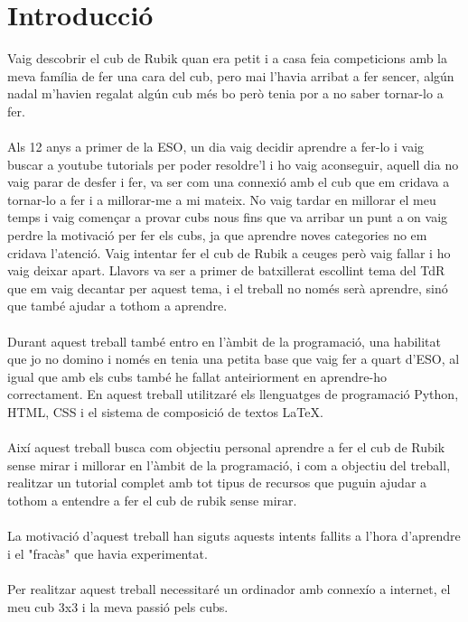 \part*{Introducció}
\pagestyle{Introducció}

Vaig descobrir el cub de Rubik quan era petit i a casa feia competicions amb la meva família de fer una cara del cub, pero mai l'havia arribat a fer sencer, algún nadal m'havien regalat algún cub més bo però tenia por a no saber tornar-lo a fer.
\\\\Als 12 anys a primer de la ESO, un dia vaig decidir aprendre a fer-lo i vaig buscar a youtube tutorials per poder resoldre'l i ho vaig aconseguir, aquell dia no vaig parar de desfer i fer, va ser com una connexió amb el cub que em cridava a tornar-lo a fer i a millorar-me a mi mateix.
No vaig tardar en millorar el meu temps i vaig començar a provar cubs nous fins que va arribar un punt a on vaig perdre la motivació per fer els cubs, ja que aprendre noves categories no em cridava l'atenció. Vaig intentar fer el cub de Rubik a ceuges però vaig fallar i ho vaig deixar apart.
Llavors va ser a primer de batxillerat escollint tema del TdR que em vaig decantar per aquest tema, i el treball no només serà aprendre, sinó que també ajudar a tothom a aprendre. 
\\\\Durant aquest treball també entro en l'àmbit de la programació, una habilitat que jo no domino i només en tenia una petita base que vaig fer a quart d'ESO, al igual que amb els cubs també he fallat anteiriorment en aprendre-ho correctament. En aquest treball utilitzaré els llenguatges de programació Python, HTML, CSS i el sistema de composició de textos LaTeX.
\\\\Així aquest treball busca com objectiu personal aprendre a fer el cub de Rubik sense mirar i millorar en l'àmbit de la programació, i com a objectiu del treball, realitzar un tutorial complet amb tot tipus de recursos que puguin ajudar a tothom a entendre a fer el cub de rubik sense mirar.
\\\\La motivació d'aquest treball han siguts aquests intents fallits a l'hora d'aprendre i el "fracàs" que havia experimentat.
\\\\Per realitzar aquest treball necessitaré un ordinador amb connexío a internet, el meu cub 3x3 i la meva passió pels cubs.




